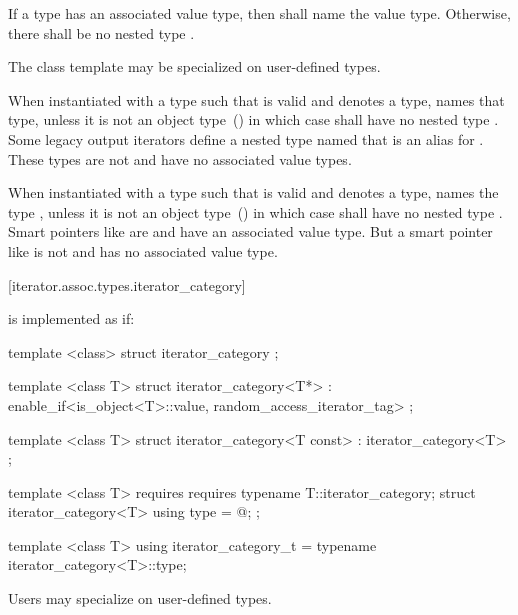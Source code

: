 \pnum
If a type  has an associated value type, then  shall name the
value type. Otherwise, there shall be no nested type .

\pnum
The  class template may be specialized on user-defined types.

\pnum
When instantiated with a type 
such that  is valid and denotes a type,
 names that type, unless it is not an object type~() in which case
 shall have no nested type . \enternote Some legacy output
iterators define a nested type named  that is an alias for . These
types are not  and have no associated value types.\exitnote

\pnum
When instantiated with a type 
such that  is valid and denotes a type,
 names the type , unless it is
not an object type~() in which case
 shall have no nested type . \enternote Smart pointers like
 are  and have an associated value type. But a smart pointer
like  is not  and has no associated value type.\exitnote

[iterator.assoc.types.iterator_category]{}

\pnum
{}%
is implemented as if:

%
\begin{codeblock}
  template <class> struct iterator_category { };

  template <class T>
  struct iterator_category<T*>
    : enable_if<is_object<T>::value, random_access_iterator_tag> { };

  template <class T>
  struct iterator_category<T const> : iterator_category<T> { };

  template <class T>
    requires requires { typename T::iterator_category; }
  struct iterator_category<T> {
    using type = @\seebelow@;
  };

  template <class T> using iterator_category_t
    = typename iterator_category<T>::type;
\end{codeblock}

\pnum
Users may specialize  on user-defined types.

